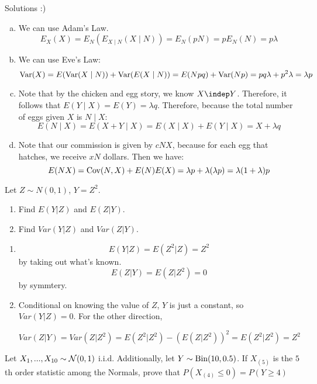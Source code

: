 \documentclass[11pt]{article}
\begin{document}
\begin{solution}

Solutions :)
\begin{enumerate}[a)]

\item We can use Adam's Law.
$$
E_X(X) = E_{N}(E_{X\mid N}(X \mid N)) = E_N(pN) = pE_N(N) = p\lambda
$$
\item We can use Eve's Law:
$$
\textrm{Var}(X) = E(\textrm{Var}(X \mid N)) + \textrm{Var}(E(X \mid N)) = E(Npq) + \textrm{Var}(Np) = pq\lambda + p^2\lambda = \lambda p
$$
\item Note that by the chicken and egg story, we know $X \indep Y$. Therefore, it follows that $E(Y \mid X) = E(Y) = \lambda q$. Therefore, because the total number of eggs given $X$ is $N \mid X$:
$$
E(N \mid X) = E(X + Y \mid X) = E(X\mid X) + E(Y \mid X) = X + \lambda q
$$
\item Note that our commission is given by $c NX$, because for each egg that hatches, we receive $xN$ dollars. Then we have:
$$
E(NX) = \textrm{Cov}(N,X) + E(N)E(X) = \lambda p + \lambda(\lambda p) = \lambda(1 + \lambda)p
$$
\end{enumerate}
\end{solution}

\begin{exercise} 
Let $Z \sim N(0,1)$, $Y = Z^2$.
\begin{enumerate}
\item Find $E(Y|Z)$ and $E(Z|Y)$.

\item Find $Var(Y|Z)$ and $Var(Z|Y)$.
\end{enumerate}
\end{exercise}

\begin{solution}
\begin{enumerate}
\item $$E(Y|Z) = E(Z^2|Z) = Z^2$$
by taking out what's known.
$$E(Z|Y) = E(Z|Z^2) = 0$$
by symmtery.

\item Conditional on knowing the value of $Z$, $Y$ is just a constant, so $Var(Y|Z) = 0$. For the other direction,

$$Var(Z|Y) = Var(Z|Z^2) = E(Z^2|Z^2) - (E(Z|Z^2))^2 = E(Z^2|Z^2) = Z^2$$
\end{enumerate}
\end{solution}

\begin{exercise}
Let $X_1,...,X_{10} \sim \mathcal{N}(0,1)$ i.i.d. Additionally, let $Y\sim \textrm{Bin}(10,0.5)$. If $X_{(5)}$ is the $5$th order statistic among the Normals, prove that $P(X_{(4)} \le 0) = P(Y\ge 4)$
\end{exercise}
\end{document}
